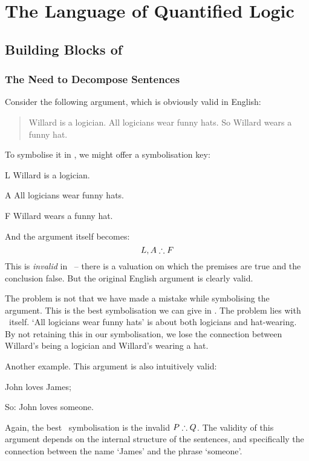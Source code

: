 \part{The Language of Quantified Logic}
\label{ch.FOL}
\chapter{Building Blocks of \textnormal{\FOL}}\label{s:FOLBuildingBlocks}
\section{The Need to Decompose Sentences}
Consider the following argument, which is obviously valid in English:
\begin{quote}
\label{willard1}
Willard is a logician. All logicians wear funny hats. So Willard wears a funny hat.
\end{quote}
To symbolise it in \TFL, we might offer a symbolisation key:
\begin{ekey}
\item[L] Willard is a logician.
\item[A] All logicians wear funny hats.
\item[F] Willard wears a funny hat.
\end{ekey}
And the argument itself becomes:
$$L, A \mathrel{\therefore} F$$
This is \emph{invalid} in \TFL\ – there is a valuation on which the premises are true and the conclusion false. But the original English argument is clearly valid.

The problem is not that we have made a mistake while symbolising the argument. This is the best symbolisation we can give in \TFL. The problem lies with \TFL\ itself. `All logicians wear funny hats' is about both logicians and hat-wearing. By not retaining this in our symbolisation, we lose the connection between Willard's being a logician and Willard's wearing a hat.

Another example. This argument is also intuitively valid:
\begin{earg}
	\item[] John loves James;
	\item[So:] John loves someone.
\end{earg} Again, the best \TFL\ symbolisation is the invalid $P \mathrel{\therefore} Q$. The validity of this argument depends on the internal structure of the sentences, and specifically the connection between the name `James' and the phrase `someone'.

